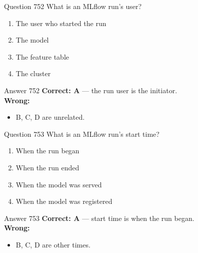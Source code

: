 \documentclass[aspectratio=169,11pt]{beamer}
\begin{document}
	\begin{frame}{Question 752}
		What is an MLflow run's user?
		\begin{enumerate}[label=\Alph*.]
			\item The user who started the run
			\item The model
			\item The feature table
			\item The cluster
		\end{enumerate}
	\end{frame}
	\begin{frame}{Answer 752}
		\textbf{Correct: A} --- the run user is the initiator.\\
		\vspace{0.5em}
		\textbf{Wrong:}
		\begin{itemize}
			\item B, C, D are unrelated.
		\end{itemize}
	\end{frame}
	
	\begin{frame}{Question 753}
		What is an MLflow run's start time?
		\begin{enumerate}[label=\Alph*.]
			\item When the run began
			\item When the run ended
			\item When the model was served
			\item When the model was registered
		\end{enumerate}
	\end{frame}
	\begin{frame}{Answer 753}
		\textbf{Correct: A} --- start time is when the run began.\\
		\vspace{0.5em}
		\textbf{Wrong:}
		\begin{itemize}
			\item B, C, D are other times.
		\end{itemize}
	\end{frame}
	
\end{document}
